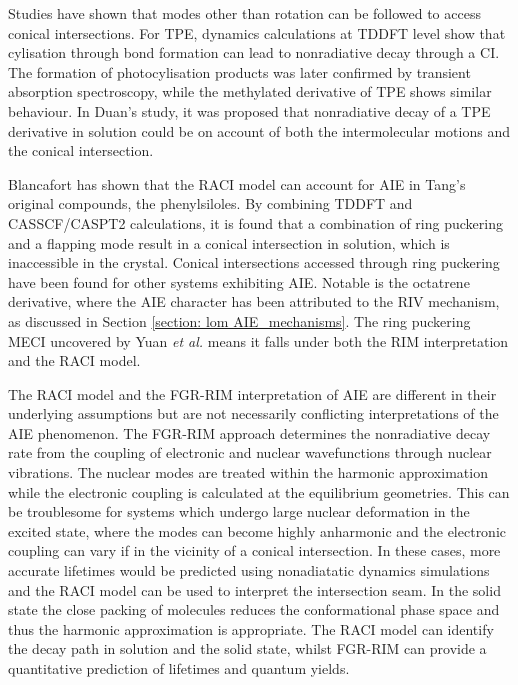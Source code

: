 Studies have shown that modes other than rotation can be followed to access conical intersections. For \ac{TPE}, dynamics calculations at TDDFT level show that cylisation through bond formation can lead to nonradiative decay through a CI.\cite{Prlj2016} The formation of photocylisation products was later confirmed by transient absorption spectroscopy, while the methylated derivative of \ac{TPE} shows similar behaviour.\cite{Cai2018a,Gao2017} In Duan's study, it was proposed that nonradiative decay of a TPE derivative in solution could be on account of both the intermolecular motions and the conical intersection.\cite{Duan2017} 

Blancafort has shown that the RACI model can account for AIE in Tang's original compounds, the phenylsiloles.\cite{Peng2016} By combining TDDFT and CASSCF/CASPT2 calculations, it is found that a combination of ring puckering and a flapping mode result in a conical intersection in solution, which is inaccessible in the crystal. Conical intersections accessed through ring puckering have been found for other systems exhibiting AIE.\cite{Sasaki2016} Notable is the octatrene derivative, where the AIE character has been attributed to the \ac{RIV} mechanism, as discussed in Section \ref{section: lom AIE_mechanisms}. \cite{Nishiuchi2013} The ring puckering \ac{MECI} uncovered by Yuan \textit{et al.} means it falls under both the \ac{RIM} interpretation and the \ac{RACI} model.\cite{Yuan2013}

The \ac{RACI} model and the \ac{FGR-RIM} interpretation of AIE are different in their underlying assumptions but are not necessarily conflicting interpretations of the AIE phenomenon. The \ac{FGR-RIM} approach determines the nonradiative decay rate from the coupling of electronic and nuclear wavefunctions through nuclear vibrations. The nuclear modes are treated within the harmonic approximation while the electronic coupling is calculated at the equilibrium geometries. This can be troublesome for systems which undergo large nuclear deformation in the excited state, where the modes can become highly anharmonic and the electronic coupling can vary if in the vicinity of a conical intersection. In these cases,  more accurate lifetimes would be predicted using nonadiatatic dynamics simulations and the \ac{RACI} model can be used to interpret the intersection seam.  In the solid state the close packing of molecules reduces the conformational phase space and thus the harmonic approximation is appropriate. The \ac{RACI} model can identify the decay path in solution and the solid state, whilst \ac{FGR-RIM} can provide a quantitative prediction of lifetimes and quantum yields.

